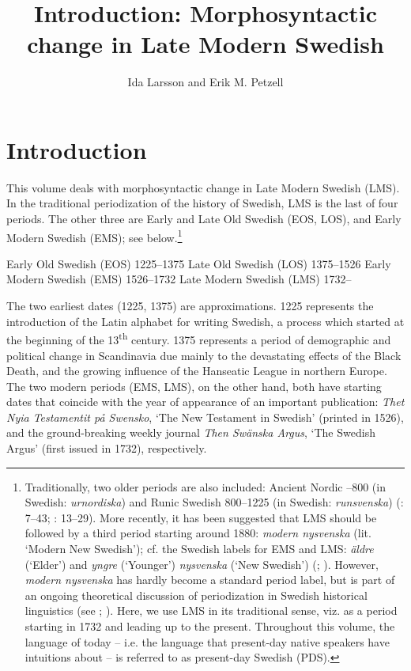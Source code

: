 \documentclass[output=paper]{langscibook}
\author{Ida Larsson\affiliation{Østfold University College, Halden} and Erik M. Petzell\affiliation{Institute for Language and Folklore, Gothenburg}}
\title{Introduction: Morphosyntactic change in Late Modern Swedish}
\begin{document}
\maketitle 



\section{Introduction}\label{sec:intro:1}


This volume deals with morphosyntactic change in Late Modern Swedish (LMS). In the traditional periodization of the history of Swedish, LMS is the last of four periods. The other three are Early and Late Old Swedish (EOS, LOS), and Early Modern Swedish (EMS); see  below.\footnote{Traditionally, two older periods are also included: Ancient Nordic –800 (in Swedish: \textit{urnordiska}) and Runic Swedish 800–1225 (in Swedish: \textit{runsvenska}) (\citealt{Wessen1958}: 7–43; \citealt{Bergman1968}: 13–29). More recently, it has been suggested that LMS should be followed by a third period starting around 1880: \textit{modern nysvenska} (lit. ‘Modern New Swedish’); cf. the Swedish labels for EMS and LMS: \textit{äldre} (‘Elder’) and \textit{yngre} (‘Younger’) \textit{nysvenska} (‘New Swedish’) (\citealt{Thelander1988}; \citealt{Malmgren2007}). However, \textit{modern nysvenska} has hardly become a standard period label, but is part of an ongoing theoretical discussion of periodization in Swedish historical linguistics (see \citealt{Ralph2000}; \citealt{Johansson2007, Johansson2010, Johansson2007}). Here, we use LMS in its traditional sense, viz. as a period starting in 1732 and leading up to the present. Throughout this volume, the language of today – i.e. the language that present-day native speakers have intuitions about – is referred to as present-day Swedish (PDS).}


\ea \label{ex:intro:1}
\ea   Early Old Swedish (EOS) 1225–1375
\ex  Late Old Swedish (LOS) 1375–1526
\ex   Early Modern Swedish (EMS) 1526–1732
\ex   Late Modern Swedish (LMS) 1732–
\z
\z

The two earliest dates (1225, 1375) are approximations. 1225 represents the introduction of the Latin alphabet for writing Swedish, a process which started at the beginning of the 13\textsuperscript{th} century. 1375 represents a period of demographic and political change in Scandinavia due mainly to the devastating effects of the Black Death, and the growing influence of the Hanseatic League in northern Europe. The two modern periods (EMS, LMS), on the other hand, both have starting dates that coincide with the year of appearance of an important publication: \textit{Thet Nyia Testamentit på Swensko}, ‘The New Testament in Swedish’ (printed in 1526), and the ground-breaking weekly journal \textit{Then Swänska Argus}, ‘The Swedish Argus’ (first issued in 1732), respectively.
\end{document}
